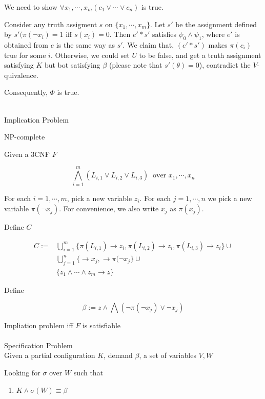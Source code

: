 \documentclass[12pt]{article}
\begin{document}
{We need to show $\forall x_1,\cdots,x_m(c_1\vee\cdots\vee c_n)$ is true.

Consider any truth assigment $s$ on $\{x_1,\cdots, x_m\}$. Let $s'$ be the assignment defined by $s'(\pi(\neg x_i)=1$ iff $s(x_i)=0$. Then $e'*s'$ satisfies $\psi_0\wedge\psi_1$, where $e'$ is obtained from $e$ is the same way as $s'$. 
We claim that, $(e'*s')$ makes $\pi(c_i)$ true for some $i$. Otherwise, we could set $U$ to be false,  and get a truth assignment satisfying $K$ but bot satisfying $\beta$ (please note that $s'(\theta)=0$), contradict the $V$-quivalence. 

Consequently, $\Phi$ is true.
 
\ \\

Implication Problem

NP-complete  

Given a 3CNF  $F$

$$\bigwedge_{i=1}^m (L_{i,1}\vee L_{i,2}\vee L_{i,3}) \ \mbox{ over } x_1,\cdots, x_n$$

For each $i=1,\cdots,m$, pick a new variable $z_i$. For each $j=1,\cdots, n$ we pick a new variable $\pi(\neg x_j)$. For convenience, we also write $x_j$ as $\pi(x_j)$. 

Define $C$ 

$$\begin{array}{ll}C:=&
\bigcup_{i=1}^m\{\pi(L_{i,1})\rightarrow z_i, \pi(L_{i,2})\rightarrow z_i, \pi(L_{i,3})\rightarrow z_i\}\cup\\ & \bigcup_{j=1}^n\{\rightarrow x_j, \rightarrow \pi(\neg x_j\} \cup\\ &
\{z_1\wedge\cdots\wedge z_m\rightarrow z\}\end{array}$$

Define 

$$\beta:=z\wedge\bigwedge (\neg \pi(\neg x_j)\vee \neg x_j)$$


Impliation problem iff $F$ is satisfiable \\


\ \\


Specification Problem\\

Given a partial configuration $K$, demand $\beta$, a set of variables $V,W$

Looking for $\sigma$ over $W$ such that

\begin{enumerate}
\item $K\wedge \sigma(W)\equiv \beta$


\end{enumerate}}
\end{document}
